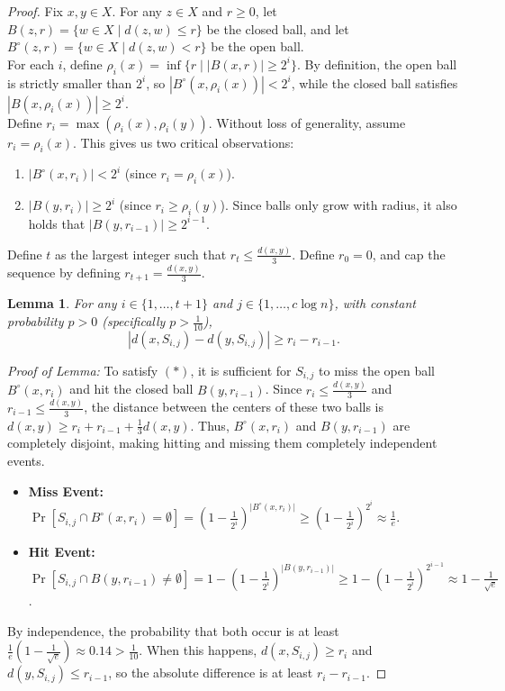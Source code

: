 \documentclass[a4paper]{article}
\newtheorem{lem}[thm]{Lemma}
\begin{document}
\begin{proof}
    Fix $x,y\in X$. For any $z \in X$ and $r \geq 0$, let $B(z,r) = \{w\in X \mid d(z,w) \leq r\}$ be the closed ball, and let $B^\circ(z,r) = \{w\in X \mid d(z,w) < r\}$ be the open ball.\\
    For each $i$, define $\rho_i(x) = \inf\{r \mid |B(x,r)| \geq 2^i\}$. By definition, the open ball is strictly smaller than $2^i$, so $|B^\circ(x,\rho_i(x))| < 2^i$, while the closed ball satisfies $|B(x,\rho_i(x))| \geq 2^i$.\\
    Define $r_i = \max(\rho_i(x), \rho_i(y))$. Without loss of generality, assume $r_i = \rho_i(x)$. This gives us two critical observations:
    \begin{enumerate}
        \item $|B^\circ(x,r_i)| < 2^i$ (since $r_i = \rho_i(x)$).
        \item $|B(y,r_i)| \geq 2^i$ (since $r_i \geq \rho_i(y)$). Since balls only grow with radius, it also holds that $|B(y,r_{i-1})| \geq 2^{i-1}$.
    \end{enumerate}
    Define $t$ as the largest integer such that $r_t \leq \frac{d(x,y)}{3}$. Define $r_0 = 0$, and cap the sequence by defining $r_{t+1} = \frac{d(x,y)}{3}$.

    \begin{lem}
        For any $i \in \{1,\dots,t+1\}$ and $j \in \{1,\dots,c\log n\}$, with constant probability $p > 0$ (specifically $p > \frac{1}{10}$),
        \[
            |d(x,S_{i,j}) - d(y,S_{i,j})| \geq r_i - r_{i-1} \tag{$*$}
        .\]
    \end{lem}
    \noindent\textit{Proof of Lemma:} To satisfy $(*)$, it is sufficient for $S_{i,j}$ to miss the open ball $B^\circ(x,r_i)$ and hit the closed ball $B(y,r_{i-1})$.
    Since $r_i \leq \frac{d(x,y)}{3}$ and $r_{i-1} \leq \frac{d(x,y)}{3}$, the distance between the centers of these two balls is $d(x,y) \geq r_i + r_{i-1} + \frac{1}{3}d(x,y)$. Thus, $B^\circ(x,r_i)$ and $B(y,r_{i-1})$ are completely disjoint, making hitting and missing them completely independent events.
    \begin{itemize}
        \item \textbf{Miss Event:} $\Pr[S_{i,j} \cap B^\circ(x,r_i) = \emptyset] = \left(1 - \frac{1}{2^i}\right)^{|B^\circ(x,r_i)|} \geq \left(1 - \frac{1}{2^i}\right)^{2^i} \approx \frac{1}{e}$.
        \item \textbf{Hit Event:} $\Pr[S_{i,j} \cap B(y,r_{i-1}) \neq \emptyset] = 1 - \left(1 - \frac{1}{2^i}\right)^{|B(y,r_{i-1})|} \geq 1 - \left(1 - \frac{1}{2^i}\right)^{2^{i-1}} \approx 1 - \frac{1}{\sqrt{e}}$.
    \end{itemize}
    By independence, the probability that both occur is at least $\frac{1}{e} \left(1 - \frac{1}{\sqrt{e}}\right) \approx 0.14 > \frac{1}{10}$. When this happens, $d(x, S_{i,j}) \geq r_i$ and $d(y, S_{i,j}) \leq r_{i-1}$, so the absolute difference is at least $r_i - r_{i-1}$.


\end{proof}
\end{document}

